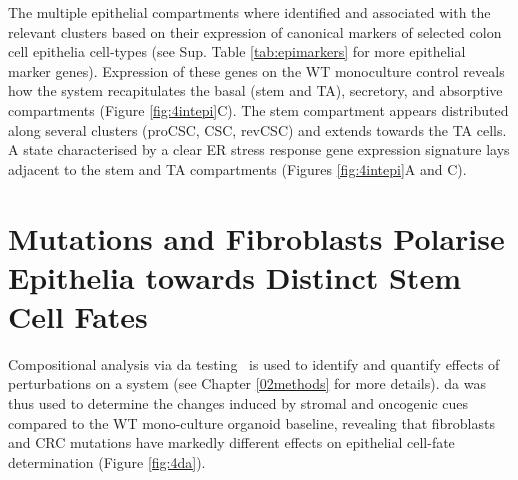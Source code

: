 The multiple epithelial compartments where identified and associated with the relevant clusters based on their expression of canonical markers of selected colon cell epithelia cell-types (see Sup. Table \ref{tab:epimarkers} for more epithelial marker genes). Expression of these genes on the WT monoculture control reveals how the system recapitulates the basal (stem and TA), secretory, and absorptive compartments (Figure \ref{fig:4intepi}C). The stem compartment appears distributed along several clusters (proCSC, CSC, revCSC) and extends towards the TA cells. A state characterised by a clear ER stress response gene expression signature lays adjacent to the stem and TA compartments (Figures \ref{fig:4intepi}A and C).

\newpage
\section{Mutations and Fibroblasts Polarise Epithelia towards Distinct Stem Cell Fates}

Compositional analysis via \acrfull{da} testing~\cite{dann_differential_2022} is used to identify and quantify effects of perturbations on a system (see Chapter \ref{02methods} for more details). \acrshort{da} was thus used to determine the changes induced by stromal and oncogenic cues compared to the WT mono-culture organoid baseline, revealing that fibroblasts and CRC mutations have markedly different effects on epithelial cell-fate determination (Figure \ref{fig:4da}). 

